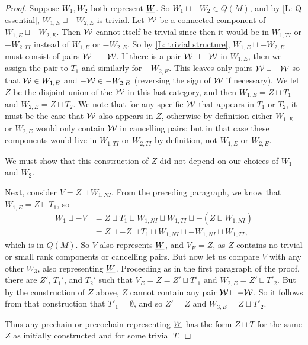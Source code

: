 \begin{proof}
	Suppose $W_1, W_2$ both represent $\underline{W}$.
	So $W_1 \sqcup -W_2 \in Q(M)$, and by \cref{L: Q essential}, $W_{1,E} \sqcup -W_{2,E}$ is trivial.
	Let $\mathcal{W}$ be a connected component of $W_{1,E} \sqcup -W_{2,E}$.
	Then $\mathcal{W}$ cannot itself be trivial since then it would be in $W_{1,TI}$ or $-W_{2,TI}$ instead of $W_{1,E}$ or $-W_{2,E}$.
	So by \cref{L: trivial structure}, $W_{1,E} \sqcup -W_{2,E}$ must consist of pairs $\mathcal{W} \sqcup -\mathcal{W}$.
	If there is a pair $\mathcal{W} \sqcup -\mathcal{W}$ in $W_{1,E}$, then we assign the pair to $T_1$ and similarly for $-W_{2,E}$.
	This leaves only pairs $\mathcal{W} \sqcup -\mathcal{W}$ so that $\mathcal{W} \in W_{1,E}$ and $-\mathcal{W} \in -W_{2,E}$ (reversing the sign of $\mathcal{W}$ if necessary).
	We let $Z$ be the disjoint union of the $\mathcal{W}$ in this last category, and then $W_{1,E} = Z \sqcup T_1$ and $W_{2,E} = Z \sqcup T_2$.
	We note that for any specific $\mathcal{W}$ that appears in $T_1$ or $T_2$, it must be the case that $\mathcal{W}$ also appears in $Z$, otherwise by definition either $W_{1,E}$ or $W_{2,E}$ would only contain $\mathcal{W}$ in cancelling pairs; but in that case these components would live in $W_{1,TI}$ or $W_{2,TI}$ by definition, not $W_{1,E}$ or $W_{2,E}$.

	We must show that this construction of $Z$ did not depend on our choices of $W_1$ and $W_2$.

	Next, consider $V = Z \sqcup W_{1,NI}$.
	From the preceding paragraph, we know that $W_{1,E} = Z \sqcup T_1$, so
	\begin{align*}
			W_1 \sqcup -V &= Z \sqcup T_1 \sqcup W_{1,NI} \sqcup W_{1,TI} \sqcup - (Z \sqcup W_{1,NI})\\
			&=Z \sqcup -Z \sqcup T_1 \sqcup W_{1,NI} \sqcup -W_{1,NI} \sqcup W_{1,TI},
	\end{align*}
	which is in $Q(M)$.
	So $V$ also represents $\underline{W}$, and $V_E = Z$, as $Z$ contains no trivial or small rank components or cancelling pairs.
	But now let us compare $V$ with any other $W_3$, also representing $\underline{W}$.
	Proceeding as in the first paragraph of the proof, there are $Z'$, $T_1'$, and $T_2'$ such that $V_E = Z = Z' \sqcup T'_1$ and $W_{2,E} = Z' \sqcup T'_2$.
	But by the construction of $Z$ above, $Z$ cannot contain any pair $\mathcal{W} \sqcup -\mathcal{W}$.
	So it follows from that construction that $T'_1 = \emptyset$, and so $Z' = Z$ and $W_{3,E} = Z \sqcup T'_2$.

	Thus any prechain or precochain representing $\underline{W}$ has the form $Z \sqcup T$ for the same $Z$ as initially constructed and for some trivial $T$.
\end{proof}


